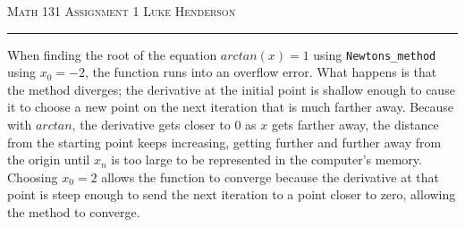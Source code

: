 \documentclass[12pt]{amsart}
\begin{document}
\begin{enumerate}
\begin{multicols}{2}
    
\columnbreak
    
\end{multicols}

\newpage
{\scshape Math 131} \hfill {\scshape \large Assignment 1} \hfill {\scshape Luke Henderson}
\smallskip
\hrule
\bigskip

When finding the root of the equation $arctan(x) = 1$ using \texttt{Newtons\_method} using $x_0 = -2$, the function runs into an overflow error. What happens is that the method diverges; the derivative at the initial point is shallow enough to cause it to choose a new point on the next iteration that is much farther away. Because with $arctan$, the derivative gets closer to $0$ as $x$ gets farther away, the distance from the starting point keeps increasing, getting further and further away from the origin until $x_n$ is too large to be represented in the computer's memory. \\
Choosing $x_0 = 2$ allows the function to converge because the derivative at that point is steep enough to send the next iteration to a point closer to zero, allowing the method to converge.

\end{enumerate}
\end{document}
